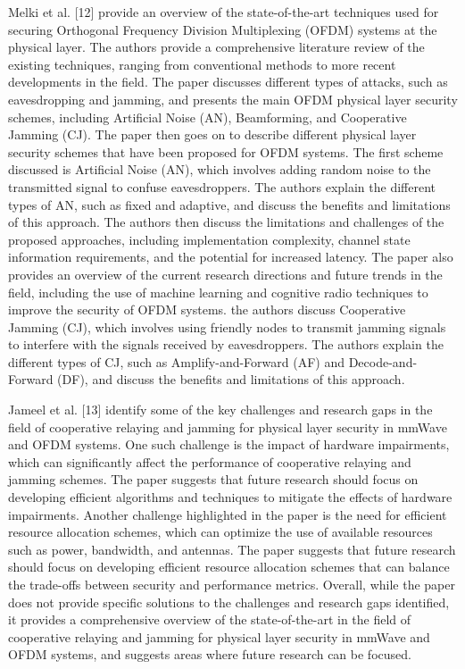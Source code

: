 \documentclass[conference]{IEEEtran}
\begin{document}
Melki et al. [12] provide an overview of the state-of-the-art techniques used for securing Orthogonal Frequency Division Multiplexing (OFDM) systems at the physical layer. The authors provide a comprehensive literature review of the existing techniques, ranging from conventional methods to more recent developments in the field. The paper discusses different types of attacks, such as eavesdropping and jamming, and presents the main OFDM physical layer security schemes, including Artificial Noise (AN), Beamforming, and Cooperative Jamming (CJ).
The paper then goes on to describe different physical layer security schemes that have been proposed for OFDM systems. The first scheme discussed is Artificial Noise (AN), which involves adding random noise to the transmitted signal to confuse eavesdroppers. The authors explain the different types of AN, such as fixed and adaptive, and discuss the benefits and limitations of this approach.
The authors then discuss the limitations and challenges of the proposed approaches, including implementation complexity, channel state information requirements, and the potential for increased latency. The paper also provides an overview of the current research directions and future trends in the field, including the use of machine learning and cognitive radio techniques to improve the security of OFDM systems.
the authors discuss Cooperative Jamming (CJ), which involves using friendly nodes to transmit jamming signals to interfere with the signals received by eavesdroppers. The authors explain the different types of CJ, such as Amplify-and-Forward (AF) and Decode-and-Forward (DF), and discuss the benefits and limitations of this approach.

Jameel et al. [13] identify some of the key challenges and research gaps in the field of cooperative relaying and jamming for physical layer security in mmWave and OFDM systems. One such challenge is the impact of hardware impairments, which can significantly affect the performance of cooperative relaying and jamming schemes. The paper suggests that future research should focus on developing efficient algorithms and techniques to mitigate the effects of hardware impairments.
Another challenge highlighted in the paper is the need for efficient resource allocation schemes, which can optimize the use of available resources such as power, bandwidth, and antennas. The paper suggests that future research should focus on developing efficient resource allocation schemes that can balance the trade-offs between security and performance metrics.
Overall, while the paper does not provide specific solutions to the challenges and research gaps identified, it provides a comprehensive overview of the state-of-the-art in the field of cooperative relaying and jamming for physical layer security in mmWave and OFDM systems, and suggests areas where future research can be focused.
\end{document}
